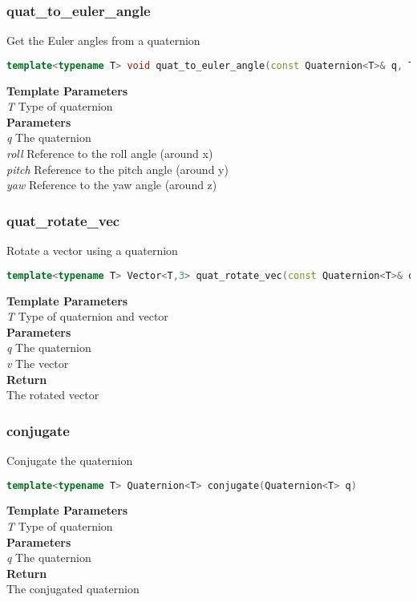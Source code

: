 \subsubsection{quat\_to\_euler\_angle}
\begin{mdframed}
Get the Euler angles from a quaternion
\begin{lstlisting}[language=C++]
template<typename T> void quat_to_euler_angle(const Quaternion<T>& q, T& roll, T& pitch, T& yaw) 
\end{lstlisting}
\textbf{Template Parameters} \\ 
\textit{T} Type of quaternion \\ 
\textbf{Parameters} \\ 
\textit{q} The quaternion \\ 
\textit{roll} Reference to the roll angle (around x) \\ 
\textit{pitch} Reference to the pitch angle (around y) \\ 
\textit{yaw} Reference to the yaw angle (around z) \\ 
\end{mdframed}

\subsubsection{quat\_rotate\_vec}
\begin{mdframed}
Rotate a vector using a quaternion
\begin{lstlisting}[language=C++]
template<typename T> Vector<T,3> quat_rotate_vec(const Quaternion<T>& q, const Vector<T,3>& v) 
\end{lstlisting}
\textbf{Template Parameters} \\ 
\textit{T} Type of quaternion and vector \\ 
\textbf{Parameters} \\ 
\textit{q} The quaternion \\ 
\textit{v} The vector \\ 
\textbf{Return} \\ 
The rotated vector\\ 
\end{mdframed}

\subsubsection{conjugate}
\begin{mdframed}
Conjugate the quaternion
\begin{lstlisting}[language=C++]
template<typename T> Quaternion<T> conjugate(Quaternion<T> q) 
\end{lstlisting}
\textbf{Template Parameters} \\ 
\textit{T} Type of quaternion \\ 
\textbf{Parameters} \\ 
\textit{q} The quaternion \\ 
\textbf{Return} \\ 
The conjugated quaternion\\ 
\end{mdframed}

